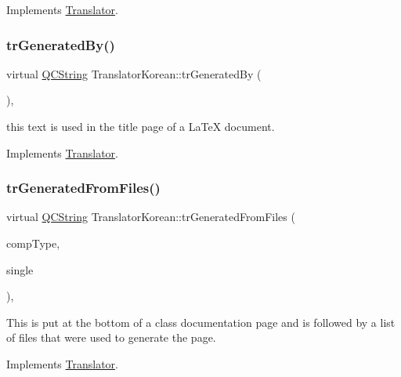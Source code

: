Implements \mbox{\hyperlink{class_translator}{Translator}}.

\mbox{\label{class_translator_korean_a8f7be1959b617957bbca2f9f3a1043c0}} 
\subsubsection{\texorpdfstring{trGeneratedBy()}{trGeneratedBy()}}
{\footnotesize\ttfamily virtual \mbox{\hyperlink{class_q_c_string}{Q\+C\+String}} Translator\+Korean\+::tr\+Generated\+By (\begin{DoxyParamCaption}{ }\end{DoxyParamCaption})\hspace{0.3cm}{\ttfamily [inline]}, {\ttfamily [virtual]}}

this text is used in the title page of a La\+TeX document. 

Implements \mbox{\hyperlink{class_translator}{Translator}}.

\mbox{\label{class_translator_korean_a08e85e571cdbaf043e49167f1642c149}} 
\subsubsection{\texorpdfstring{trGeneratedFromFiles()}{trGeneratedFromFiles()}}
{\footnotesize\ttfamily virtual \mbox{\hyperlink{class_q_c_string}{Q\+C\+String}} Translator\+Korean\+::tr\+Generated\+From\+Files (\begin{DoxyParamCaption}\item[{\mbox{\hyperlink{class_class_def_ae70cf86d35fe954a94c566fbcfc87939}{Class\+Def\+::\+Compound\+Type}}}]{comp\+Type,  }\item[{bool}]{single }\end{DoxyParamCaption})\hspace{0.3cm}{\ttfamily [inline]}, {\ttfamily [virtual]}}

This is put at the bottom of a class documentation page and is followed by a list of files that were used to generate the page. 

Implements \mbox{\hyperlink{class_translator}{Translator}}.


